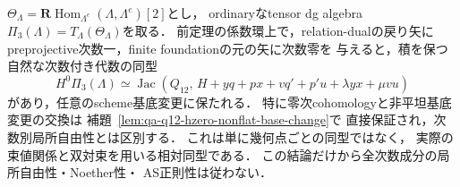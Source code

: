 \begin{theorem}
\label{thm:qa-two-mass-jacobian-preprojective}
$\Theta_\Lambda=
 \mathbf R\operatorname{Hom}_{\Lambda^e}
              (\Lambda,\Lambda^e)[2]$とし，
ordinaryなtensor dg algebra
$\Pi_3(\Lambda)=T_\Lambda(\Theta_\Lambda)$を取る．
前定理の係数環上で，relation-dualの戻り矢に
preprojective次数一，finite foundationの元の矢に次数零を
与えると，積を保つ自然な次数付き代数の同型
\[
 \boxed{\quad
 H^0\Pi_3(\Lambda)
 \simeq
 \operatorname{Jac}
  (Q_{12},\,H+yq+px+vq'+p'u+\lambda yx+\mu vu)
 \quad}
 \tag{JP}\label{eq:qa-two-mass-jacobian-preprojective}
\]
があり，任意のscheme基底変更に保たれる．
特に零次cohomologyと非平坦基底変更の交換は
補題~\ref{lem:qa-q12-hzero-nonflat-base-change}で
直接保証され，次数別局所自由性とは区別する．
これは単に幾何点ごとの同型ではなく，
実際の束値関係と双対束を用いる相対同型である．
この結論だけから全次数成分の局所自由性・Noether性・
AS正則性は従わない．
\end{theorem}

